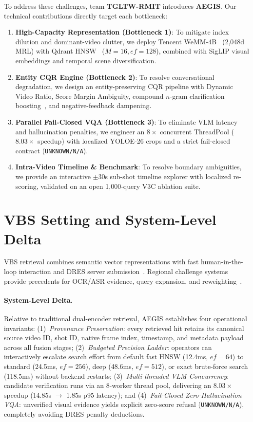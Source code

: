 \documentclass[runningheads,a4paper]{llncs}
\newcommand{\code}[1]{\texttt{#1}}
\begin{document}
To address these challenges, team \textbf{TGLTW-RMIT} introduces \textbf{AEGIS}. Our technical contributions directly target each bottleneck:
\begin{enumerate}\setlength{\itemsep}{1pt}\setlength{\parskip}{0pt}
    \item \textbf{High-Capacity Representation (Bottleneck 1)}: To mitigate index dilution and dominant-video clutter, we deploy Tencent WeMM-4B~\cite{wemm2025} (2,048d MRL) with Qdrant HNSW~\cite{malkov2018efficient,qdrant} ($M=16, ef=128$), combined with SigLIP visual embeddings and temporal scene diversification.
    \item \textbf{Entity CQR Engine (Bottleneck 2)}: To resolve conversational degradation, we design an entity-preserving CQR pipeline with Dynamic Video Ratio, Score Margin Ambiguity, compound $n$-gram clarification boosting~\cite{sekulic2021evaluating}, and negative-feedback dampening.
    \item \textbf{Parallel Fail-Closed VQA (Bottleneck 3)}: To eliminate VLM latency and hallucination penalties, we engineer an $8\times$ concurrent ThreadPool ($8.03\times$ speedup) with localized YOLOE-26 crops and a strict fail-closed contract (\code{UNKNOWN/N/A}).
    \item \textbf{Intra-Video Timeline \& Benchmark}: To resolve boundary ambiguities, we provide an interactive $\pm 30$s sub-shot timeline explorer with localized re-scoring, validated on an open 1,000-query V3C ablation suite.
\end{enumerate}

\section{VBS Setting and System-Level Delta}
\label{sec:setting}

VBS retrieval combines semantic vector representations with fast human-in-the-loop interaction and DRES server submission~\cite{sauter2024performance,rossetto2021vitrivr}. Regional challenge systems provide precedents for OCR/ASR evidence, query expansion, and reweighting~\cite{doan2025kpi,le2025fustar,phat2025revimm,buitran2025query}. 

\paragraph{System-Level Delta.} Relative to traditional dual-encoder retrieval, AEGIS establishes four operational invariants:
(1)~\emph{Provenance Preservation}: every retrieved hit retains its canonical source video ID, shot ID, native frame index, timestamp, and metadata payload across all fusion stages;
(2)~\emph{Budgeted Precision Ladder}: operators can interactively escalate search effort from default fast HNSW (12.4ms, $ef=64$) to standard (24.5ms, $ef=256$), deep (48.6ms, $ef=512$), or exact brute-force search (118.5ms) without backend restarts;
(3)~\emph{Multi-threaded VLM Concurrency}: candidate verification runs via an 8-worker thread pool, delivering an $8.03\times$ speedup (14.85s $\to$ 1.85s p95 latency); and
(4)~\emph{Fail-Closed Zero-Hallucination VQA}: unverified visual evidence yields explicit zero-score refusal (\code{UNKNOWN/N/A}), completely avoiding DRES penalty deductions.
\end{document}
